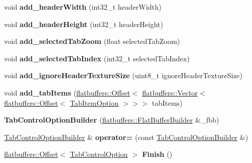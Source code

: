 \begin{DoxyCompactItemize}
void {\bfseries add\+\_\+header\+Width} (int32\+\_\+t header\+Width)
\item 
\mbox{\label{structflatbuffers_1_1TabControlOptionBuilder_adb55a3c8529fe12a7b9188945b1b83c6}} 
void {\bfseries add\+\_\+header\+Height} (int32\+\_\+t header\+Height)
\item 
\mbox{\label{structflatbuffers_1_1TabControlOptionBuilder_a41c5bf7bbc5d850158c815898278f0e6}} 
void {\bfseries add\+\_\+selected\+Tab\+Zoom} (float selected\+Tab\+Zoom)
\item 
\mbox{\label{structflatbuffers_1_1TabControlOptionBuilder_a736fb2f91d205082cf4209675c87f8f8}} 
void {\bfseries add\+\_\+selected\+Tab\+Index} (int32\+\_\+t selected\+Tab\+Index)
\item 
\mbox{\label{structflatbuffers_1_1TabControlOptionBuilder_ad3d329473b2af67e84c1e1a8f8039360}} 
void {\bfseries add\+\_\+ignore\+Header\+Texture\+Size} (uint8\+\_\+t ignore\+Header\+Texture\+Size)
\item 
\mbox{\label{structflatbuffers_1_1TabControlOptionBuilder_a40306b8272f8c73a93fd6c0b3405ad0d}} 
void {\bfseries add\+\_\+tab\+Items} (\hyperlink{structflatbuffers_1_1Offset}{flatbuffers\+::\+Offset}$<$ \hyperlink{classflatbuffers_1_1Vector}{flatbuffers\+::\+Vector}$<$ \hyperlink{structflatbuffers_1_1Offset}{flatbuffers\+::\+Offset}$<$ \hyperlink{structflatbuffers_1_1TabItemOption}{Tab\+Item\+Option} $>$$>$$>$ tab\+Items)
\item 
\mbox{\label{structflatbuffers_1_1TabControlOptionBuilder_ae80886c2b17b75eeac4ec1b7b600faa4}} 
{\bfseries Tab\+Control\+Option\+Builder} (\hyperlink{classflatbuffers_1_1FlatBufferBuilder}{flatbuffers\+::\+Flat\+Buffer\+Builder} \&\+\_\+fbb)
\item 
\mbox{\label{structflatbuffers_1_1TabControlOptionBuilder_acff9c1ba190eebd282086d8c23dd466d}} 
\hyperlink{structflatbuffers_1_1TabControlOptionBuilder}{Tab\+Control\+Option\+Builder} \& {\bfseries operator=} (const \hyperlink{structflatbuffers_1_1TabControlOptionBuilder}{Tab\+Control\+Option\+Builder} \&)
\item 
\mbox{\label{structflatbuffers_1_1TabControlOptionBuilder_ac0586ec9b411f45157f337412de57537}} 
\hyperlink{structflatbuffers_1_1Offset}{flatbuffers\+::\+Offset}$<$ \hyperlink{structflatbuffers_1_1TabControlOption}{Tab\+Control\+Option} $>$ {\bfseries Finish} ()
\end{DoxyCompactItemize}
